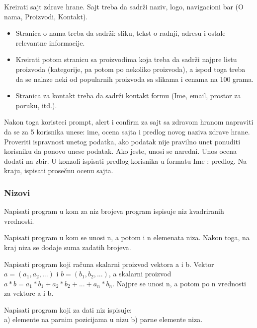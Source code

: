 \begin{primer}
Kreirati sajt zdrave hrane. Sajt treba da sadrži naziv, logo, navigacioni bar (O nama, Proizvodi, Kontakt). 
\begin{itemize}
    \item Stranica o nama treba da sadrži: sliku, tekst o radnji, adresu i ostale relevantne informacije. 
    \item Kreirati potom stranicu sa proizvodima koja treba da sadrži najpre listu proizvoda (kategorije, pa potom po nekoliko proizvoda), a ispod toga treba da se nalaze neki od popularnih proizvoda sa slikama i cenama na 100 grama. 
    \item Stranica za kontakt treba da sadrži kontakt formu (Ime, email, prostor za poruku, itd.).  
\end{itemize}

Nakon toga koristeci prompt, alert i confirm za sajt sa zdravom hranom napraviti da se za 5 korisnika unese: ime, ocena sajta i predlog novog naziva zdrave hrane. Proveriti ispravnost unetog podatka, ako podatak nije pravilno unet ponuditi korisniku da ponovo unese podatak. Ako jeste, unosi se naredni. Unos ocena dodati na zbir. U konzoli ispisati predlog korisnika u formatu Ime : predlog. Na kraju, ispisati prosečnu ocenu sajta.
\end{primer}

\subsubsection{Nizovi}

\begin{primer}
Napisati program u kom za niz brojeva program ispisuje niz kvadriranih vrednosti.
\end{primer}

\begin{primer}
Napisati program u kom se unosi n, a potom i n elemenata niza. Nakon toga, na kraj niza se dodaje suma zadatih brojeva.
\end{primer}

\begin{primer}
Napisati program koji računa skalarni proizvod vektora a i b. Vektor $a=(a_1, a_2,...)$ i $b=(b_1, b_2,...)$, a skalarni proizvod $a*b= a_1 * b_1 + a_2 * b_2 + ... + a_n * b_n$. Najpre se unosi n, a potom po n vrednosti za vektore a i b. 
\end{primer}

\begin{primer}
Napisati program koji za dati niz ispisuje:\\
a) elemente na parnim pozicijama u nizu
b) parne elemente niza.
\end{primer}

